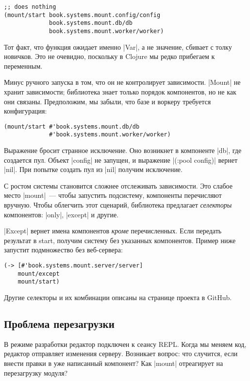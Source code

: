 \begin{verbatim}
;; does nothing
(mount/start book.systems.mount.config/config
             book.systems.mount.db/db
             book.systems.mount.worker/worker)
\end{verbatim}

Тот факт, что функция ожидает именно \spverb|Var|, а не значение, сбивает с
толку новичков. Это не очевидно, поскольку в Clojure мы редко прибегаем к
переменным.

Минус ручного запуска в том, что он не контролирует зависимости. \spverb|Mount|
не хранит зависимости; библиотека знает только порядок компонентов, но не как
они связаны. Предположим, мы забыли, что базе и воркеру требуется конфигурация:

\begin{verbatim}
(mount/start #'book.systems.mount.db/db
             #'book.systems.mount.worker/worker)
\end{verbatim}

Выражение бросит странное исключение. Оно возникнет в компоненте \spverb|db|,
где создается пул. Объект \spverb|config| не запущен, и выражение \spverb|(:pool
config)| вернет \spverb|nil|. При попытке создать пул из \spverb|nil| получим
исключение.

С ростом системы становится сложнее отслеживать зависимости. Это слабое место
\spverb|mount|~--- чтобы запустить подсистему, компоненты перечисляют
вручную. Чтобы облегчить этот сценарий, библиотека предлагает \emph{селекторы}
компонентов: \spverb|only|, \spverb|except| и другие.

\spverb|Except| вернет имена компонентов \emph{кроме} перечисленных. Если
передать результат в start, получим систему без указанных компонентов. Пример
ниже запустит подмножество без веб-сервера:

\begin{verbatim}
(-> [#'book.systems.mount.server/server]
    mount/except
    mount/start)
\end{verbatim}

Другие селекторы и их комбинации описаны на странице проекта в GitHub.

\subsection{Проблема перезагрузки}

В режиме разработки редактор подключен к сеансу REPL. Когда мы меняем код,
редактор отправляет изменения серверу. Возникает вопрос: что случится, если
внести правки в уже написанный компонент? Как \spverb|mount| отреагирует на
перезагрузку модуля?

